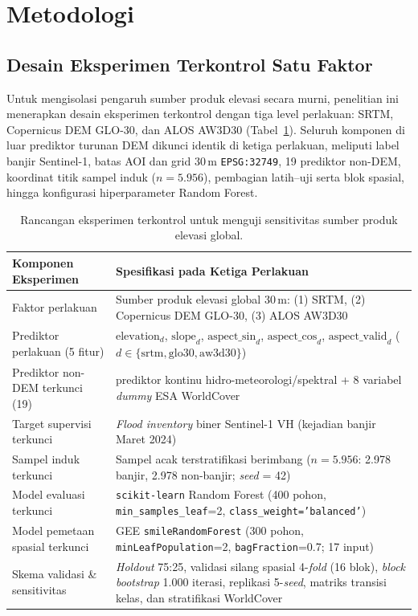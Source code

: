 \documentclass[11pt,twoside]{article}
\begin{document}
\section{Metodologi}\label{sec:metodologi}

\subsection{Desain Eksperimen Terkontrol Satu Faktor}\label{subsec:desain-eksperimen}

Untuk mengisolasi pengaruh sumber produk elevasi secara murni, penelitian ini menerapkan desain eksperimen terkontrol dengan tiga level perlakuan: SRTM, Copernicus DEM GLO-30, dan ALOS AW3D30 (Tabel~\ref{tab:desain-id}). Seluruh komponen di luar prediktor turunan DEM dikunci identik di ketiga perlakuan, meliputi label banjir Sentinel-1, batas AOI dan grid 30\,m \texttt{EPSG:32749}, 19 prediktor non-DEM, koordinat titik sampel induk ($n=5.956$), pembagian latih--uji serta blok spasial, hingga konfigurasi hiperparameter Random Forest.

\begin{table}[!htbp]
\small
\centering
\caption{Rancangan eksperimen terkontrol untuk menguji sensitivitas sumber produk elevasi global.}
\label{tab:desain-id}
\begin{tabular}{>{\raggedright}p{4.5cm} >{\raggedright\arraybackslash}p{9.8cm}}
\toprule
\textbf{Komponen Eksperimen} & \textbf{Spesifikasi pada Ketiga Perlakuan} \\
\midrule
Faktor perlakuan & Sumber produk elevasi global 30\,m: (1) SRTM, (2) Copernicus DEM GLO-30, (3) ALOS AW3D30 \\
Prediktor perlakuan (5 fitur) & $\text{elevation}_d$, $\text{slope}_d$, $\text{aspect\_sin}_d$, $\text{aspect\_cos}_d$, $\text{aspect\_valid}_d$ ($d \in \{\text{srtm}, \text{glo30}, \text{aw3d30}\}$) \\
Prediktor non-DEM terkunci (19) & 11 prediktor kontinu hidro-meteorologi/spektral + 8 variabel \textit{dummy} ESA WorldCover \\
Target supervisi terkunci & \textit{Flood inventory} biner Sentinel-1 VH (kejadian banjir Maret 2024) \\
Sampel induk terkunci & Sampel acak terstratifikasi berimbang ($n = 5.956$: 2.978 banjir, 2.978 non-banjir; \textit{seed} = 42) \\
Model evaluasi terkunci & \texttt{scikit-learn} Random Forest (400 pohon, \texttt{min\_samples\_leaf}=2, \texttt{class\_weight='balanced'}) \\
Model pemetaan spasial terkunci & GEE \texttt{smileRandomForest} (300 pohon, \texttt{minLeafPopulation}=2, \texttt{bagFraction}=0.7; 17 input) \\
Skema validasi \& sensitivitas & \textit{Holdout} 75:25, validasi silang spasial 4-\textit{fold} (16 blok), \textit{block bootstrap} 1.000 iterasi, replikasi 5-\textit{seed}, matriks transisi kelas, dan stratifikasi WorldCover \\
\bottomrule
\end{tabular}
\end{table}
\end{document}
